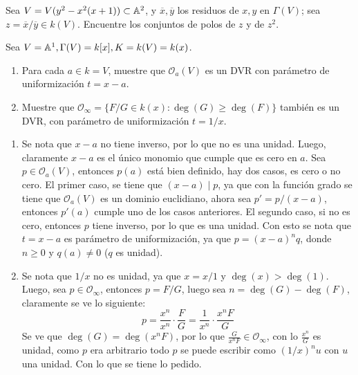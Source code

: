 \begin{prob}{2.17}
    Sea \(V=V(y^2-x^2(x+1))\subset\mathbb{A}^2\), y \(\overline{x},\overline{y}\) los residuos de \(x,y\) en \(\Gamma(V)\); sea \(z=\overline{x}/\overline{y}\in k(V)\). Encuentre los conjuntos de polos de \(z\) y de \(z^2\).
\end{prob}

\begin{sol}{2.17}

\end{sol}

\begin{prob}{2.24}
    Sea \(V=\mathbb{A}^1,\Gamma(V)=k[x],K=k(V)=k(x)\).
    \begin{enumerate}
        \item Para cada \(a\in k=V\), muestre que \(\mathcal{O}_a(V)\) es un DVR con parámetro de uniformización \(t=x-a\).
        \item Muestre que \(\mathcal{O}_\infty=\{F/G\in k(x):\deg(G)\geq\deg(F)\}\) también es un DVR, con parámetro de uniformización \(t=1/x\).
    \end{enumerate}
\end{prob}

\begin{sol}{2.24}
    \begin{enumerate}
        \item Se nota que \(x-a\) no tiene inverso, por lo que no es una unidad. Luego, claramente \(x-a\) es el único monomio que cumple que es cero en \(a\). Sea \(p\in\mathcal{O}_a(V)\), entonces \(p(a)\) está bien definido, hay dos casos, es cero o no cero. El primer caso, se tiene que \((x-a)\mid p\), ya que con la función grado se tiene que \(\mathcal{O}_a(V)\) es un dominio euclidiano, ahora sea \(p'=p/(x-a)\), entonces \(p'(a)\) cumple uno de los casos anteriores. El segundo caso, si no es cero, entonces \(p\) tiene inverso, por lo que es una unidad. Con esto se nota que \(t=x-a\) es parámetro de uniformización, ya que \(p=(x-a)^nq\), donde \(n\geq0\) y \(q(a)\neq0\) (\(q\) es unidad).
        \item Se nota que \(1/x\) no es unidad, ya que \(x=x/1\) y \(\deg(x)>\deg(1)\). Luego, sea \(p\in\mathcal{O}_\infty\), entonces \(p=F/G\), luego sea \(n=\deg(G)-\deg(F)\), claramente se ve lo siguiente:
              \[
                  p=\frac{x^n}{x^n}\cdot\frac{F}G=\frac1{x^n}\cdot\frac{x^nF}G
              \]
              Se ve que \(\deg(G)=\deg(x^nF)\), por lo que \(\frac{G}{x^nF}\in\mathcal{O}_\infty\), con lo \(\frac{x^n}G\) es unidad, como \(p\) era arbitrario todo \(p\) se puede escribir como \((1/x)^nu\) con \(u\) una unidad. Con lo que se tiene lo pedido.
    \end{enumerate}
\end{sol}

